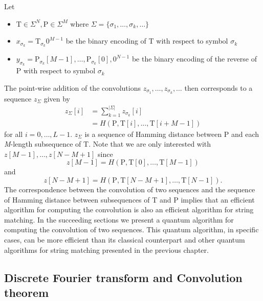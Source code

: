 Let
\begin{itemize}
    \item $\mathrm{T} \in \Sigma^{N}, \mathrm{P} \in \Sigma^{M}$ where $\Sigma=\{\sigma_1, \ldots, \sigma_k, \ldots\}$
    \item $x_{\sigma_k}=\mathrm{T}_{\sigma_k}0^{M-1}$ be the binary encoding of T with respect to symbol $\sigma_k$
    \item $y_{\sigma_k}=\mathrm{P}_{\sigma_k}[M-1],\ldots,\mathrm{P}_{\sigma_k}[0],0^{N-1}$ be the binary encoding of the reverse of P with respect to symbol $\sigma_k$
\end{itemize}
The point-wise addition of the convolutions $z_{\sigma_1}, \ldots, z_{\sigma_k}, \ldots$ then corresponds to a sequence $z_{\Sigma}$ given by
\begin{align}
	    z_{\Sigma}[i] &= \sum_{k=1}^{\vert \Sigma \vert} z_{\sigma_k}[i]\\
	                                          &= H\left( \mathrm{P}, \mathrm{T}[i],\ldots,\mathrm{T}[i+M-1] \right)\nonumber
\end{align}
for all $i=0,\ldots,L-1$. $z_{\Sigma}$ is a sequence of Hamming distance between P and each \textit{M}-length subsequence of T. Note that we are only interested with $z[M-1],\ldots,z[N-M+1]$ since 
\[
	z[M-1]=H\left(\mathrm{P}, \mathrm{T}[0],\ldots,\mathrm{T}[M-1]\right)
\]
and 
\[
	z[N-M+1]=H\left( \mathrm{P},\mathrm{T}[N-M+1],\ldots,\mathrm{T}[N-1]\right).
\]
The correspondence between the convolution of two sequences and the sequence of Hamming distance between subsequences of T and P implies that an efficient algorithm for computing the convolution is also an efficient algorithm for string matching. In the succeeding sections we present a quantum algorithm for computing the convolution of two sequences. This quantum algorithm, in specific cases, can be more efficient than its classical counterpart and other quantum algorithms for string matching presented in the previous chapter.

\subsection{Discrete Fourier transform and Convolution theorem}

